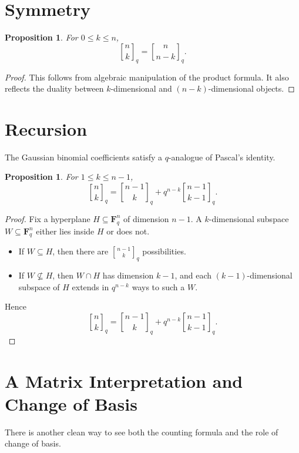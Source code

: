 \documentclass[11pt]{article}
\newtheorem{proposition}[theorem]{Proposition}
\theoremstyle{definition}
\theoremstyle{remark}
\newcommand{\F}{\mathbf{F}}
\newcommand{\qbinom}[2]{\genfrac{[}{]}{0pt}{}{#1}{#2}_q}
\begin{document}
	\section{Symmetry}
	
	\begin{proposition}
		For \(0\le k\le n\),
		\[
		\qbinom{n}{k}=\qbinom{n}{n-k}.
		\]
	\end{proposition}
	
	\begin{proof}
		This follows from algebraic manipulation of the product formula. It also reflects the duality between \(k\)-dimensional and \((n-k)\)-dimensional objects.
	\end{proof}
	
	\section{Recursion}
	
	The Gaussian binomial coefficients satisfy a \(q\)-analogue of Pascal's identity.
	
	\begin{proposition}
		For \(1\le k\le n-1\),
		\[
		\qbinom{n}{k}
		=
		\qbinom{n-1}{k}
		+
		q^{n-k}\qbinom{n-1}{k-1}.
		\]
	\end{proposition}
	
	\begin{proof}
		Fix a hyperplane \(H\subseteq \F_q^n\) of dimension \(n-1\). A \(k\)-dimensional subspace \(W\subseteq \F_q^n\) either lies inside \(H\) or does not.
		
		\begin{itemize}
			\item If \(W\subseteq H\), then there are \(\qbinom{n-1}{k}\) possibilities.
			\item If \(W\not\subseteq H\), then \(W\cap H\) has dimension \(k-1\), and each \((k-1)\)-dimensional subspace of \(H\) extends in \(q^{n-k}\) ways to such a \(W\).
		\end{itemize}
		
		Hence
		\[
		\qbinom{n}{k}
		=
		\qbinom{n-1}{k}
		+
		q^{n-k}\qbinom{n-1}{k-1}.
		\]
	\end{proof}
	
	\section{A Matrix Interpretation and Change of Basis}
	
	There is another clean way to see both the counting formula and the role of change of basis.
	
\end{document}
